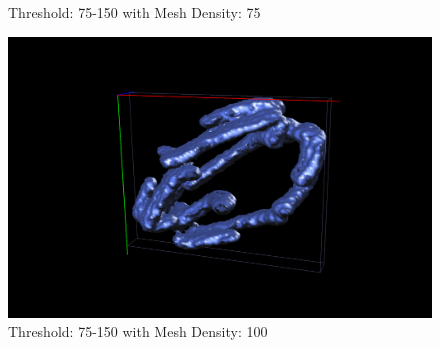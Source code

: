 \documentclass{article}
\begin{document}
\begin{figure}[ht]
\begin{minipage}[b]{0.5\linewidth}
    \captionsetup{width=.8\linewidth}
    \caption{Threshold: 75-150 with Mesh Density: 75}
    \label{fig:75150_75}
    \vspace{4ex}
  \end{minipage}%
  \begin{minipage}[b]{0.5\linewidth}
    \centering
    \includegraphics[width=.8\linewidth]{Report/Images/6.3.2/75-150_100.png}
    \captionsetup{width=.8\linewidth}
    \caption{Threshold: 75-150 with Mesh Density: 100}
    \label{fig:75150_100}
    \vspace{4ex}
  \end{minipage} 
\end{figure}
\end{document}
